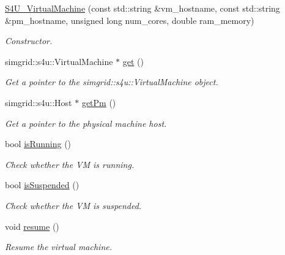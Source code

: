 \begin{DoxyCompactItemize}
\item 
\hyperlink{classwrench_1_1_s4_u___virtual_machine_addac41abb2982e54857a85c0d12c4e31}{S4\+U\+\_\+\+Virtual\+Machine} (const std\+::string \&vm\+\_\+hostname, const std\+::string \&pm\+\_\+hostname, unsigned long num\+\_\+cores, double ram\+\_\+memory)
\begin{DoxyCompactList}\small\item\em Constructor. \end{DoxyCompactList}\item 
simgrid\+::s4u\+::\+Virtual\+Machine $\ast$ \hyperlink{classwrench_1_1_s4_u___virtual_machine_a3ad67f398b7e9d4f29885b2a2e7409f5}{get} ()
\begin{DoxyCompactList}\small\item\em Get a pointer to the simgrid\+::s4u\+::\+Virtual\+Machine object. \end{DoxyCompactList}\item 
simgrid\+::s4u\+::\+Host $\ast$ \hyperlink{classwrench_1_1_s4_u___virtual_machine_a6e02ca55b7d380f758381b91ced83dea}{get\+Pm} ()
\begin{DoxyCompactList}\small\item\em Get a pointer to the physical machine host. \end{DoxyCompactList}\item 
bool \hyperlink{classwrench_1_1_s4_u___virtual_machine_a5a5f2c45b48758870ac0221fa169ab88}{is\+Running} ()
\begin{DoxyCompactList}\small\item\em Check whether the VM is running. \end{DoxyCompactList}\item 
bool \hyperlink{classwrench_1_1_s4_u___virtual_machine_a4da281f4c3fda739d18c5b608c9ef21f}{is\+Suspended} ()
\begin{DoxyCompactList}\small\item\em Check whether the VM is suspended. \end{DoxyCompactList}\item 
\mbox{\label{classwrench_1_1_s4_u___virtual_machine_acb8717a7a7364f6698400e7b4f0f29a2}} 
void \hyperlink{classwrench_1_1_s4_u___virtual_machine_acb8717a7a7364f6698400e7b4f0f29a2}{resume} ()
\begin{DoxyCompactList}\small\item\em Resume the virtual machine. \end{DoxyCompactList}\item 

\end{DoxyCompactItemize}
